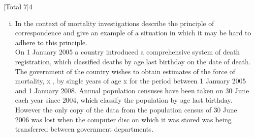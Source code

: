 \documentclass[a4paper,12pt]{article}
\begin{document}
\begin{enumerate}

[Total 7]4
\begin{enumerate}[(i)]
\item In the context of mortality investigations describe the principle of
correspondence and give an example of a situation in which it may be hard to
adhere to this principle.
\\ \medskip 
On 1 January 2005 a country introduced a comprehensive system of death
registration, which classified deaths by age last birthday on the date of death.
The government of the country wishes to obtain estimates of the force of mortality,
\mu x , by single years of age x for the period between 1 January 2005 and 1 January
2008. Annual population censuses have been taken on 30 June each year since 2004,
which classify the population by age last birthday. However the only copy of the data
from the population census of 30 June 2006 was lost when the computer disc on
which it was stored was being transferred between government departments.


\end{enumerate}
\end{enumerate}
\end{document}
